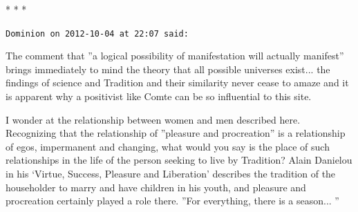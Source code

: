 
\begin{center}* * *\end{center}

\begin{footnotesize}
\begin{sffamily}
\texttt{Dominion on 2012-10-04 at 22:07 said:}

The comment that ''a logical possibility of manifestation will actually manifest'' brings immediately to mind the theory that all possible universes exist... the findings of science and Tradition and their similarity never cease to amaze and it is apparent why a positivist like Comte can be so influential to this site.

I wonder at the relationship between women and men described here. Recognizing that the relationship of ''pleasure and procreation'' is a relationship of egos, impermanent and changing, what would you say is the place of such relationships in the life of the person seeking to live by Tradition? Alain Danielou in his `Virtue, Success, Pleasure and Liberation' describes the tradition of the householder to marry and have children in his youth, and pleasure and procreation certainly played a role there. ''For everything, there is a season... ''


\hfill

\end{sffamily}
\end{footnotesize}

